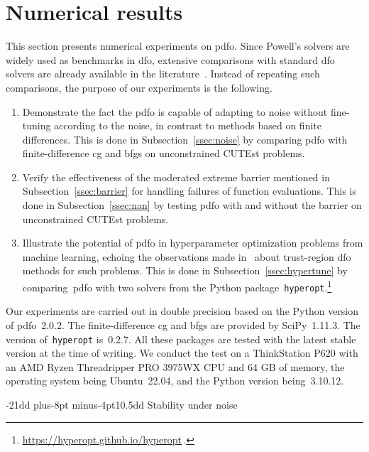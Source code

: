 \documentclass[smallextended,final]{svjour3}
\makeatletter
\def\subsection{\@startsection{subsection}{2}{\z@}%
    {-21dd plus-8pt minus-4pt}{10.5dd}
    {\normalsize\bfseries}}
\newcommand{\modified}[1]{\texorpdfstring{{\color{RoyalBlue}#1}}{#1}}
\makeatother
\begin{document}
\section{Numerical results}
\label{sec:numerical}

This section presents numerical experiments on \gls{pdfo}.
Since Powell's solvers are widely used as benchmarks in \gls{dfo}, extensive comparisons with standard \gls{dfo} solvers are already available in the literature~\cite{More_Wild_2009,Rios_Sahinidis_2013}.
Instead of repeating such comparisons, the purpose of our experiments is the following.
\begin{enumerate}
    \item Demonstrate the fact the \gls{pdfo} is capable of adapting to noise without fine-tuning according to the noise, in contrast to methods based on finite differences.
        This is done in Subsection~\ref{ssec:noise} by comparing \gls{pdfo} with finite-difference \gls{cg} and \gls{bfgs} on unconstrained CUTEst problems.
    \item Verify the effectiveness of the moderated extreme barrier mentioned in Subsection~\ref{ssec:barrier} for handling failures of function evaluations.
        This is done in Subsection~\ref{ssec:nan} by testing \gls{pdfo} with and without the barrier on unconstrained CUTEst problems.
    \item Illustrate the potential of \gls{pdfo} in hyperparameter optimization problems from machine learning, echoing the observations made in~\cite{Ghanbari_Scheinberg_2017} about trust-region \gls{dfo} methods for such problems.
        This is done in Subsection~\ref{ssec:hypertune} by comparing~\gls{pdfo} with two solvers from the Python package~\texttt{hyperopt}.\footnote{\url{https://hyperopt.github.io/hyperopt}\,.}
\end{enumerate}

Our experiments are carried out in double precision based on the Python version of \gls{pdfo}~\modified{2.0.2}.
The finite-difference \gls{cg} and \gls{bfgs} are provided by SciPy~\modified{1.11.3}.
The version of~\texttt{hyperopt} is~0.2.7.
All these packages are tested with the latest stable version at the time of writing.
We conduct the test on a ThinkStation P620 with an AMD Ryzen Threadripper PRO 3975WX CPU and 64 GB of memory, the operating system being Ubuntu~22.04, and the Python version being~\modified{3.10.12}.

\subsection{Stability under noise}
\label{ssec:noise}
\end{document}
